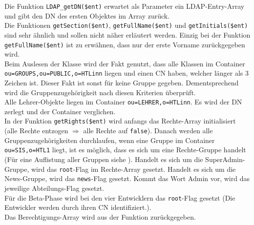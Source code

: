 
Die Funktion \texttt{LDAP\_getDN(\$ent)} erwartet als Parameter ein LDAP-Entry-Array und gibt den DN des ersten Objektes im Array zurück.\\
Die Funktionen \texttt{getSection(\$ent)}, \texttt{getFullName(\$ent)} und \texttt{getInitials(\$ent)} sind sehr ähnlich und sollen nicht näher erläutert werden. Einzig bei der Funktion \texttt{getFullName(\$ent)} ist zu erwähnen, dass nur der erste Vorname zurückgegeben wird.\\


Beim Auslesen der Klasse wird der Fakt genutzt, dass alle Klassen im Container \texttt{ou=GROUPS,ou=PUBLIC,o=HTLinn} liegen und einen CN haben, welcher länger als 3 Zeichen ist. Dieser Fakt ist sonst für keine Gruppe gegeben. Dementsprechend wird die Gruppenzugehörigkeit nach diesen Kriterien überprüft.\\


Alle Lehrer-Objekte liegen im Container \texttt{ou=LEHRER,o=HTLinn}. Es wird der DN zerlegt und der Container verglichen.\\


In der Funktion \texttt{getRights(\$ent)} wird anfangs das Rechte-Array initialisiert (alle Rechte entzogen $ \Longrightarrow $ alle Rechte auf \texttt{false}). Danach werden alle Gruppenzugehörigkeiten durchlaufen, wenn eine Gruppe im Container \texttt{ou=SIS,o=HTL1} liegt, ist es möglich, dass es sich um eine Rechte-Gruppe handelt (Für eine Auflistung aller Gruppen siehe ). Handelt es sich um die SuperAdmin-Gruppe,  wird das \texttt{root}-Flag im Rechte-Array gesetzt. Handelt es sich um die News-Gruppe, wird das \texttt{news}-Flag gesetzt. Kommt das Wort Admin vor, wird das jeweilige Abteilungs-Flag gesetzt.\\
Für die Beta-Phase wird bei den vier Entwicklern das \texttt{root}-Flag gesetzt (Die Entwickler werden durch ihren CN identifiziert.).\\
Das Berechtigungs-Array wird aus der Funktion zurückgegeben.\\

